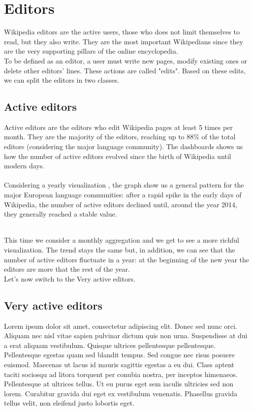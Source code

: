 \chapter{Editors}
\label{cha:456}

Wikipedia editors are the active users, those who does not limit themselves to read, but they also write. They are the most important Wikipedians since they are the very supporting pillars of the online encyclopedia.\\
To be defined as an editor, a user must write new pages, modify existing ones or delete other editors' lines. These actions are called "edits". Based on these edits, we can split the editors in two classes.

\section{Active editors}
\label{sec:research}
Active editors are the editors who edit Wikipedia pages at least 5 times per month. They are the majority of the editors, reaching up to 88\% of the total editors (considering the major language community).
The dashboards shows us how the number of active editors evolved since the birth of Wikipedia until modern days.\\

\\

Considering a yearly visualization , the graph show us a general pattern for the major European language communities: after a rapid spike in the early days of Wikipedia, the number of active editors declined until, around the year 2014, they generally reached a stable value.

\\

This time we consider a monthly aggregation and we get to see a more richful visualization. The trend stays the same but, in addition, we can see that the number of active editors fluctuate in a year: at the beginning of the new year the editors are more that the rest of the year.\\
Let's now switch to the Very active editors.
\section{Very active editors}
\label{sec:research}

Lorem ipsum dolor sit amet, consectetur adipiscing elit. Donec sed nunc orci. Aliquam nec nisl vitae sapien pulvinar dictum quis non urna. Suspendisse at dui a erat aliquam vestibulum. Quisque ultrices pellentesque pellentesque. Pellentesque egestas quam sed blandit tempus. Sed congue nec risus posuere euismod. Maecenas ut lacus id mauris sagittis egestas a eu dui. Class aptent taciti sociosqu ad litora torquent per conubia nostra, per inceptos himenaeos. Pellentesque at ultrices tellus. Ut eu purus eget sem iaculis ultricies sed non lorem. Curabitur gravida dui eget ex vestibulum venenatis. Phasellus gravida tellus velit, non eleifend justo lobortis eget.
\cite{ictbusiness}
\cite{donoho}

